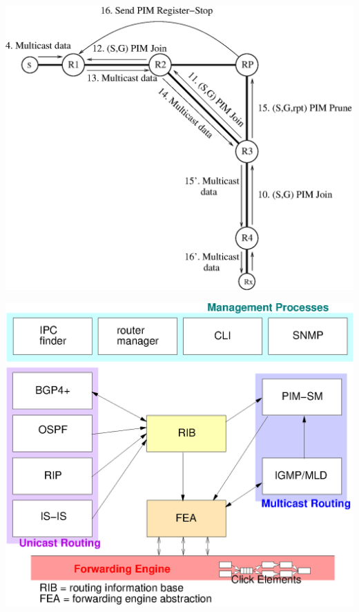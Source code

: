\documentclass[landscape]{icsislides}
\begin{document}
\begin{slide}

\begin{center}
  \includegraphics[width=6.0in]{figs/pim_protocol_overview2}
\end{center}

\end{slide}

\begin{slide}

\begin{center}
  \includegraphics[width=6.0in]{figs/xorp_arch}
\end{center}

\end{slide}
\end{document}
